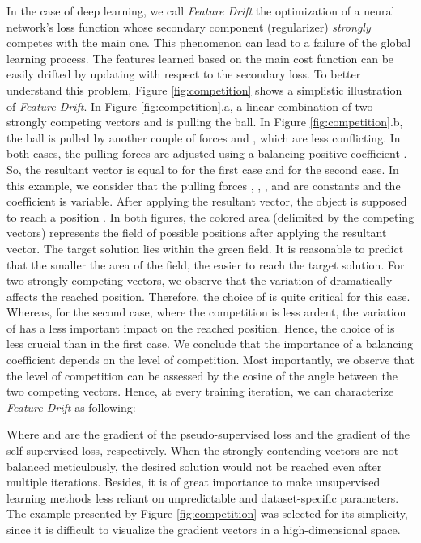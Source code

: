 \documentclass{article}
\begin{document}
In the case of deep learning, we call \textit{Feature Drift} the optimization of a neural network's loss function whose secondary component (regularizer) \textit{strongly} competes with the main one.
This phenomenon can lead to a failure of the global learning process. The features learned based on the main cost function can be easily drifted by updating with respect to the secondary loss. To better understand this problem, Figure \ref{fig:competition} shows a simplistic illustration of \textit{Feature Drift}. In Figure \ref{fig:competition}.a, a linear combination of two strongly competing vectors  and  is pulling the ball. In Figure \ref{fig:competition}.b, the ball is pulled by another couple of forces  and , which are less conflicting. In both cases, the pulling forces are adjusted using a balancing positive coefficient . So, the resultant vector is equal to  for the first case and   for the second case. In this example, we consider that the pulling forces , , , and  are constants and the  coefficient is variable. After applying the resultant vector, the object is supposed to reach a position . In both figures, the colored area (delimited by the competing vectors) represents the field of possible positions after applying the resultant vector. The target solution lies within the green field. It is reasonable to predict that the smaller the area of the field, the easier to reach the target solution.
For two strongly competing vectors, we observe that the variation of  dramatically affects the reached position. Therefore,  the choice of  is quite critical for this case. Whereas, for the second case, where the competition is less ardent, the variation of  has a less important impact on the reached position. Hence, the choice of  is less crucial than in the first case. We conclude that the importance of a balancing coefficient depends on the level of competition. Most importantly, we observe that the level of competition can be assessed by the cosine of the angle between the two competing vectors. Hence, at every training iteration, we can characterize \textit{Feature Drift} as following:



Where  and  are the gradient of the pseudo-supervised loss and the gradient of the self-supervised loss, respectively. When the strongly contending vectors are not balanced meticulously, the desired solution would not be reached even after multiple iterations. Besides, it is of great importance to make unsupervised learning methods less reliant on unpredictable and dataset-specific parameters. The example presented by Figure \ref{fig:competition} was selected for its simplicity, since it is difficult to visualize the gradient vectors in a high-dimensional space.
\end{document}
